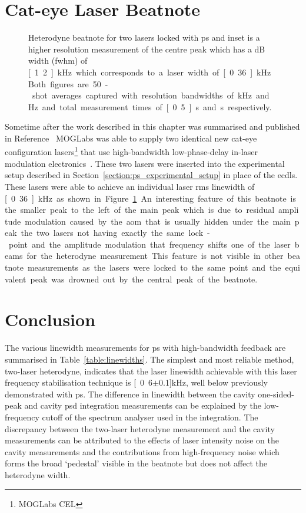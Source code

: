 \section{Cat-eye Laser Beatnote}

\begin{figure}
\center

\caption[Heterodyne beatnote for two cat-eye lasers locked with high-bandwidth polarisation spectroscopy.]{Heterodyne beatnote for two lasers locked with \gls{ps} and inset is a higher resolution measurement of the centre peak which has a \unit[-3]{dB} width (\gls{fwhm}) of \unit[1.2]{kHz} which corresponds to a laser width of \unit[0.36]{kHz}.
Both figures are 50-shot averages captured with resolution bandwidths of \unit[30]{kHz} and \unit[100]{Hz} and total measurement times of \unit[0.5]{s} and \unit[2]{s} respectively.}
\label{figure:cateye_beatnote}
\end{figure}

Sometime after the work described in this chapter was summarised and published in Reference~\cite{torrance_sub-kilohertz_2016} MOGLabs was able to supply two identical new cat-eye configuration lasers\footnote{MOGLabs CEL} that use high-bandwidth low-phase-delay in-laser modulation electronics~\cite{thompson_narrow_2012}.
These two lasers were inserted into the experimental setup described in Section~\ref{section:ps_experimental_setup} in place of the \glspl{ecdl}.
These lasers were able to achieve an individual laser \gls{rms} linewidth of \unit[0.36]{kHz} as shown in Figure~\ref{figure:cateye_beatnote}.
An interesting feature of this beatnote is the smaller peak to the left of the main peak which is due to residual amplitude modulation caused by the \gls{aom} that is usually hidden under the main peak.
 the two lasers not having exactly the same lock-point and the amplitude modulation  that frequency shifts one of the laser beams for the heterodyne measurement.
This feature is not visible in other beatnote measurements as the lasers were locked to the same point and the equivalent peak was drowned out by the central peak of the beatnote.

\section{Conclusion}

The various linewidth measurements for \gls{ps} with high-bandwidth feedback are summarised in Table~\ref{table:linewidths}.
The simplest and most reliable method, two-laser heterodyne, indicates that the laser linewidth achievable with this laser frequency stabilisation technique is \unit[0.6$\pm$0.1]{kHz}, well below previously demonstrated with \gls{ps}.
The difference in linewidth between the cavity one-sided-peak and cavity \gls{psd} integration measurements can be explained by the low-frequency cutoff of the spectrum analyser used in the integration.
The discrepancy between the two-laser heterodyne measurement and the cavity measurements can be attributed to the effects of laser intensity noise on the cavity measurements and the contributions from high-frequency noise which forms the broad `pedestal' visible in the beatnote but does not affect the heterodyne width.

